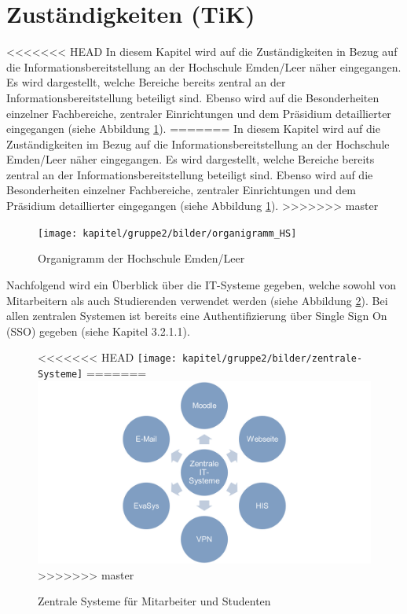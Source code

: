 \section{Zuständigkeiten (TiK)}
\label{section_zustaendigkeiten}
<<<<<<< HEAD
In diesem Kapitel wird auf die Zuständigkeiten in Bezug auf die Informationsbereitstellung an der Hochschule Emden/Leer näher eingegangen. Es wird dargestellt, welche Bereiche bereits zentral an der Informationsbereitstellung beteiligt sind. Ebenso wird auf die Besonderheiten einzelner Fachbereiche, zentraler Einrichtungen und dem Präsidium detaillierter eingegangen (siehe Abbildung \ref{fig_organigramm_HS}). 
=======
In diesem Kapitel wird auf die Zuständigkeiten im Bezug auf die Informationsbereitstellung an der Hochschule Emden/Leer näher eingegangen. Es wird dargestellt, welche Bereiche bereits zentral an der Informationsbereitstellung beteiligt sind. Ebenso wird auf die Besonderheiten einzelner Fachbereiche, zentraler Einrichtungen und dem Präsidium detaillierter eingegangen (siehe Abbildung \ref{fig_organigramm_HS}). 
>>>>>>> master

\begin{figure}[h!]
	\centering
	\texttt{[image: kapitel/gruppe2/bilder/organigramm\_HS]}
	\caption{Organigramm der Hochschule Emden/Leer}
	\label{fig_organigramm_HS}
\end{figure}

Nachfolgend wird ein Überblick über die IT-Systeme gegeben, welche sowohl von Mitarbeitern als auch Studierenden verwendet werden (siehe Abbildung  \ref{fig_zentrale_systeme}). Bei allen zentralen Systemen ist bereits eine Authentifizierung über Single Sign On (SSO) gegeben (siehe Kapitel 3.2.1.1).

\begin{figure}[h!]
	\centering
<<<<<<< HEAD
	\texttt{[image: kapitel/gruppe2/bilder/zentrale-Systeme]}
=======
	\includegraphics[width=14cm]{kapitel/gruppe2/bilder/zentrale_systeme}
>>>>>>> master
	\caption{Zentrale Systeme für Mitarbeiter und Studenten}
	\label{fig_zentrale_systeme}
\end{figure}


